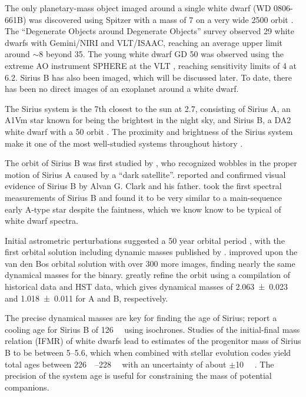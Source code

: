 \documentclass[twocolumn]{aastex631}
\begin{document}
The only planetary-mass object imaged around a single white dwarf (WD 0806-661B) was discovered using Spitzer with a mass of \qty{7}{\jupitermass} on a very wide \qty{2500}{\au} orbit \citep{luhman_discovery_2011}. The ``Degenerate Objects around Degenerate Objects'' survey \citep[DODO;][]{hogan_dodo_2009} observed 29 white dwarfs with Gemini/NIRI and VLT/ISAAC, reaching an average upper limit around $\sim$\qty{8}{\jupitermass} beyond \qty{35}{\au}. The young white dwarf GD 50 was observed using the extreme AO instrument SPHERE at the VLT \citep{xu_extreme-ao_2015}, reaching sensitivity limits of \qty{4}{\jupitermass} at \qty{6.2}{\au}. Sirius B has also been imaged, which will be discussed later. To date, there has been no direct images of an exoplanet around a white dwarf.

The Sirius system is the 7th closest to the sun at \qty{2.7}{\parsec}, consisting of Sirius A, an A1Vm star known for being the brightest in the night sky, and Sirius B, a DA2 white dwarf with a \qty{50}{\year} orbit \citep{bond_sirius_2017,collaboration_gaia_2018}. The proximity and brightness of the Sirius system make it one of the most well-studied systems throughout history \citep[see][]{wesemael_sirius_1982}.

The orbit of Sirius B was first studied by \citet{bessel_variations_1844}, who recognized wobbles in the proper motion of Sirius A caused by a ``dark satellite''. \citet{bond_companion_1862} reported and confirmed visual evidence of Sirius B by Alvan G. Clark and his father. \citet{adams_spectrum_1915} took the first spectral measurements of Sirius B and found it to be very similar to a main-sequence early A-type star despite the faintness, which we know know to be typical of white dwarf spectra. 

Initial astrometric perturbations suggested a 50 year orbital period \citep{auwers_orbit_1864}, with the first orbital solution including dynamic masses published by \citet{van_den_bos_orbit_1960}. \citet{gatewood_study_1978} improved upon the van den Bos orbital solution with over 300 more images, finding nearly the same dynamical masses for the binary. \citet{bond_sirius_2017} greatly refine the orbit using a compilation of historical data and HST data, which gives dynamical masses of \qty{2.063+-0.023}{\solarmass} and \qty{1.018+-0.011}{\solarmass} for A and B, respectively. 

The precise dynamical masses are key for finding the age of Sirius; \citet{bond_sirius_2017} report a cooling age for Sirius B of \qty{126}{\mega\year} using isochrones. Studies of the initial-final mass relation (IFMR) of white dwarfs \citep{cummings_two_2016} lead to estimates of the progenitor mass of Sirius B to be between \qtyrange{5}{5.6}{\solarmass}, which when combined with stellar evolution codes yield total ages between \qtyrange{226}{228}{\mega\year} with an uncertainty of about $\pm$\qty{10}{\mega\year} \citep{bond_sirius_2017}. The precision of the system age is useful for constraining the mass of potential companions.
\end{document}
